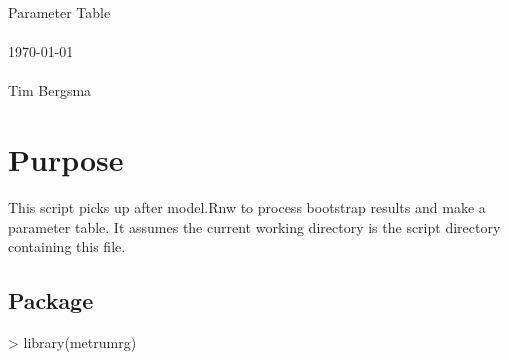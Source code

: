 
\usepackage{Sweave}

 

\vspace*{2cm}
\begin{center}
{\Large Parameter Table}\\
~\\
\today\\
~\\
Tim Bergsma\\
\end{center}
\newpage

\section{Purpose}
This script picks up after model.Rnw to process bootstrap results and make a parameter table. It assumes the current working directory is the script directory containing this file.
\subsection{Package}
\begin{Schunk}
\begin{Sinput}
> library(metrumrg)
\end{Sinput}
\end{Schunk}
